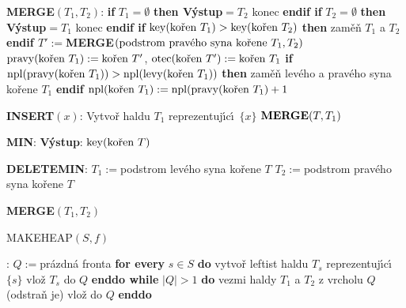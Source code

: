 {\bf MERGE$(T_1,T_2)$}:\newline 
{\bf if} $T_1=\emptyset$ {\bf then V\'ystup$=T_2$} konec {\bf endif\newline 
if} $T_2=\emptyset$ {\bf then V\'ystup$=T_1$} konec {\bf endif\newline 
if} $\key(\text{\rm ko\v ren }T_1)>\key(\text{\rm ko\v ren }T_2)$ {\bf then\newline}
\phantom{---}zam\v e\v n $T_1$ a $T_2$\newline 
{\bf endif\newline 
$T':=$MERGE$(\text{{\rm podstrom prav\'eho syna ko\v rene }}T_1,T_
2)$\newline 
$\pravy(\text{{\rm {\rm ko\v ren }}}T_1):=\text{{\rm {\rm ko\v ren }}}
T'$}, 
$\otec(\text{\rm ko\v ren }T'):=\text{\rm ko\v ren }T_1$\newline 
{\bf if} $\npl(\pravy(\text{\rm ko\v ren }T_1))>\npl(\levy(\text{\rm ko\v ren }
T_1))$ {\bf then}\newline
\phantom{---}zam\v e\v n lev\'eho a prav\'eho syna ko\v rene $T_1$\newline 
{\bf endif\newline 
$\npl(\text{{\rm {\rm ko\v ren }}}T_1):=\npl(\pravy(\text{{\rm {\rm ko\v ren }}}
T_1)+1$}
\bigskip

{\bf INSERT$(x)$}:\newline 
Vytvo\v r haldu $T_1$ reprezentuj\'\i c\'\i\ $\{x\}$\newline 
$\bold M\bold E\bold R\bold G\bold E(T,T_1)$
\bigskip

{\bf MIN}:\newline 
{\bf V\'ystup}: $\key(\text{\rm ko\v ren }T)$
\bigskip

{\bf DELETEMIN}:\newline 
$T_1:=$podstrom lev\'eho syna ko\v rene $T$\newline 
$T_2:=$podstrom prav\'eho syna ko\v rene $T$\newline 
{\bf MERGE$(T_1,T_2)$
\bigskip

MAKEHEAP$(S,f)$}:\newline 
$Q:=$pr\'azdn\'a fronta\newline 
{\bf for every} $s\in S$ {\bf do}\newline 
\phantom{---}vytvo\v r leftist haldu $T_s$ reprezentuj\'\i c\'\i\ $\{s\}$\newline 
\phantom{---}vlo\v z $T_s$ do $Q$\newline 
{\bf enddo\newline 
while} $|Q|>1$ {\bf do}\newline 
\phantom{---}vezmi haldy $T_1$ a $T_2$ z vrcholu $Q$ (odstra\v n je)\newline 
\phantom{---}{\bf MERGE$(T_1,T_2)$} vlo\v z do $Q$\newline
{\bf enddo}
\bigskip


